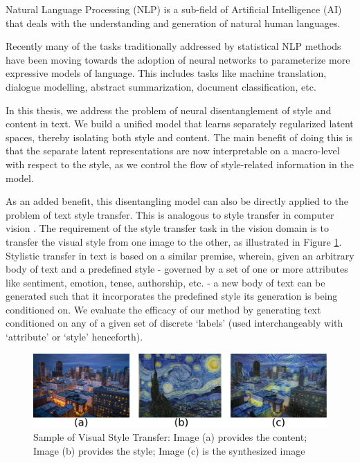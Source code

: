 Natural Language Processing (NLP) is a sub-field of Artificial Intelligence (AI) that deals with the understanding and generation of natural human languages.

Recently many of the tasks traditionally addressed by statistical NLP methods have been moving towards the adoption of neural networks to parameterize more expressive models of language. This includes tasks like machine translation, dialogue modelling, abstract summarization, document classification, etc.

In this thesis, we address the problem of neural disentanglement of style and content in text. We build a unified model that learns separately regularized latent spaces, thereby isolating both style and content. The main benefit of doing this is that the separate latent representations are now interpretable on a macro-level with respect to the style, as we control the flow of style-related information in the model.

As an added benefit, this disentangling model can also be directly applied to the problem of text style transfer. This is analogous to style transfer in computer vision \citep{gatys2016image}. The requirement of the style transfer task in the vision domain is to transfer the visual style from one image to the other, as illustrated in Figure \ref{fig:style-transfer-vision}. Stylistic transfer in text is based on a similar premise, wherein, given an arbitrary body of text and a predefined style - governed by a set of one or more attributes like sentiment, emotion, tense, authorship, etc. - a new body of text can be generated such that it incorporates the predefined style its generation is being conditioned on. We evaluate the efficacy of our method by generating text conditioned on any of a given set of discrete `labels' (used interchangeably with `attribute' or `style' henceforth).

\begin{figure}[ht]
	\centering
	\includegraphics[width=\textwidth]{images/style-transfer-vision}
	\caption{\label{fig:style-transfer-vision}Sample of Visual Style Transfer: Image (a) provides the content; Image (b) provides the style; Image (c) is the synthesized image}
\end{figure}


